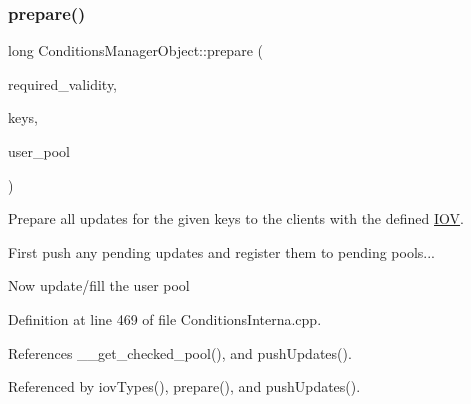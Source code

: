 \subsubsection{\texorpdfstring{prepare()}{prepare()}\hspace{0.1cm}{\footnotesize\ttfamily [1/4]}}
{\footnotesize\ttfamily long Conditions\+Manager\+Object\+::prepare (\begin{DoxyParamCaption}\item[{const \hyperlink{class_d_d4hep_1_1_i_o_v}{I\+OV} \&}]{required\+\_\+validity,  }\item[{const \hyperlink{class_d_d4hep_1_1_conditions_1_1_conditions_manager_object_aad75140018040c6ad49e56a4d56a35ee}{Condition\+Keys} \&}]{keys,  }\item[{\hyperlink{class_d_d4hep_1_1dd4hep__ptr}{dd4hep\+\_\+ptr}$<$ \hyperlink{class_d_d4hep_1_1_conditions_1_1_user_pool}{User\+Pool} $>$ \&}]{user\+\_\+pool }\end{DoxyParamCaption})}



Prepare all updates for the given keys to the clients with the defined \hyperlink{class_d_d4hep_1_1_i_o_v}{I\+OV}. 

First push any pending updates and register them to pending pools...

Now update/fill the user pool 

Definition at line 469 of file Conditions\+Interna.\+cpp.



References \+\_\+\+\_\+get\+\_\+checked\+\_\+pool(), and push\+Updates().



Referenced by iov\+Types(), prepare(), and push\+Updates().

\hypertarget{class_d_d4hep_1_1_conditions_1_1_conditions_manager_object_a50cd5fe85ead70ca4a0561ca37cbc435}{}\label{class_d_d4hep_1_1_conditions_1_1_conditions_manager_object_a50cd5fe85ead70ca4a0561ca37cbc435} 
